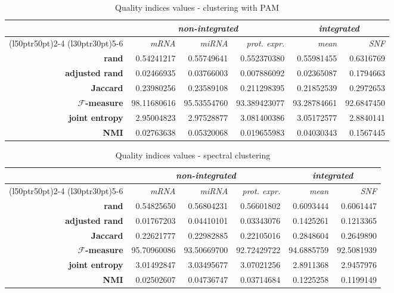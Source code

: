 \begin{table}
    \centering
    \begin{tabularx}{\linewidth}{rrrrrr}
         & \multicolumn{3}{c}{\textit{non-integrated}} & \multicolumn{2}{c}{\textit{integrated}} \\
        \cmidrule(l{50pt}r{50pt}){2-4} 
        \cmidrule(l{30pt}r{30pt}){5-6}
         & \textit{mRNA} & \textit{miRNA} & \textit{prot. expr.} & \textit{mean} & \textit{SNF}\\
        \midrule
        \textbf{rand} & 0.54241217 & 0.55749641 & 0.552370380 & 0.55981455 & 0.6316769\\
        \textbf{adjusted rand} & 0.02466935 & 0.03766003 & 0.007886092 & 0.02365087 & 0.1794663\\
        \textbf{Jaccard} & 0.23980256 & 0.23589108 & 0.211298395 & 0.21852539 & 0.2972653\\
        \textbf{$\mathcal{F}$-measure} & 98.11680616 & 95.53554760 & 93.389423077 & 93.28784661 & 92.6847450\\
        \textbf{joint entropy} & 2.95004823 & 2.97528877 & 3.081400386 & 3.05172577 & 2.8840141\\
        \textbf{NMI} & 0.02763638 & 0.05320068 & 0.019655983 & 0.04030343 & 0.1567445\\
        \bottomrule		
    \end{tabularx}
    \caption{Quality indices values - clustering with PAM}\label{tab:indices_PAM}
\end{table}

\begin{table}
    \centering
    \begin{tabularx}{\linewidth}{rrrrrr}
         & \multicolumn{3}{c}{\textit{non-integrated}} & \multicolumn{2}{c}{\textit{integrated}} \\
         \cmidrule(l{50pt}r{50pt}){2-4} 
         \cmidrule(l{30pt}r{30pt}){5-6}
         & \textit{mRNA} & \textit{miRNA} & \textit{prot. expr.} & \textit{mean} & \textit{SNF}\\
        \midrule
        \textbf{rand} & 0.54825650 & 0.56804231 & 0.56601802 & 0.6093444 & 0.6061447\\
        \textbf{adjusted rand} & 0.01767203 & 0.04410101 & 0.03343076 & 0.1425261 & 0.1213365\\
        \textbf{Jaccard} & 0.22621777 & 0.22982885 & 0.22105016 & 0.2848604 & 0.2649890\\
        \textbf{$\mathcal{F}$-measure} & 95.70960086 & 93.50669700 & 92.72429722 & 94.6885759 & 92.5081939\\
        \textbf{joint entropy} & 3.01492847 & 3.03495677 & 3.07021256 & 2.8911368 & 2.9457976\\
        \textbf{NMI} & 0.02502607 & 0.04736747 & 0.03714684 & 0.1225258 & 0.1199149\\
        \bottomrule		
    \end{tabularx}
    \caption{Quality indices values - spectral clustering}\label{tab:indices_sc}
\end{table}
